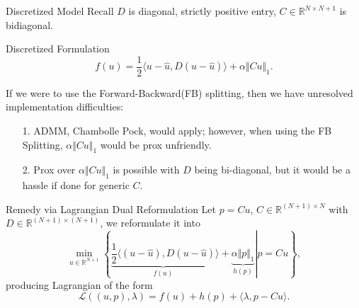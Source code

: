 \documentclass[11pt]{beamer}
\theoremstyle{definition}
\begin{document}
    \begin{frame}{Discretized Model}
        Recall $D$ is diagonal, strictly positive entry, $C\in \mathbb R^{N\times N+ 1}$ is bidiagonal. 
        \begin{block}{Discretized Formulation}
            \[ 
                f(u) = \frac{1}{2}\langle u - \hat u, D(u - \hat u)\rangle + \alpha \Vert Cu\Vert_1.     
            \]
        \end{block}
        If we were to use the Forward-Backward(FB) splitting, then we have unresolved implementation difficulties: 
        \pause
        \begin{itemize}
            \item [1.] ADMM, Chambolle Pock, would apply; however, when using the FB Splitting, $\alpha\Vert Cu\Vert_1$ would be prox unfriendly. 
            \item [2.] Prox over $\alpha \Vert C u\Vert_1$ is possible with $D$ being bi-diagonal, but it would be a hassle if done for generic $C$. 
        \end{itemize}
    \end{frame}
    \begin{frame}{Remedy via Lagrangian Dual Reformulation}
        Let $p = Cu$, $C\in \mathbb R^{(N + 1)\times N}$ with $D \in \mathbb R^{(N + 1)\times (N + 1)}$, we reformulate it into 
        \[
            \min_{u\in \mathbb R^{N + 1}}     
            \left\lbrace
                \left.
                    \underbrace{\frac{1}{2}\langle (u - \hat u), D(u - \hat u)}_{f(u)}\rangle 
                    + 
                    \underbrace{\alpha \Vert p\Vert_1}_{h(p)}
                \right| 
                p = Cu
            \right\rbrace, 
        \]
        producing Lagrangian of the form 
        \[
            \mathcal L((u, p), \lambda) = 
            f(u) + h(p) + \langle \lambda, p - Cu\rangle. 
        \]
    \end{frame}
\end{document}
